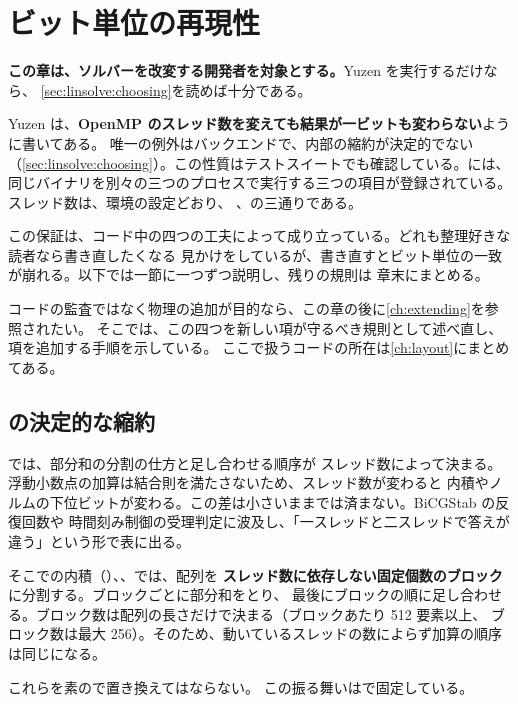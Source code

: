 \chapter{ビット単位の再現性}
\label{ch:reproducibility}

\textbf{この章は、ソルバーを改変する開発者を対象とする。}Yuzen を実行するだけなら、
\cref{sec:linsolve:choosing}を読めば十分である。

Yuzen は、\textbf{OpenMP のスレッド数を変えても結果が一ビットも変わらない}ように書いてある。
唯一の例外はバックエンドで、内部の縮約が決定的でない
（\cref{sec:linsolve:choosing}）。この性質はテストスイートでも確認している。には、
同じバイナリを別々の三つのプロセスで実行する三つの項目が登録されている。スレッド数は、環境の設定どおり、
、の三通りである。

この保証は、コード中の四つの工夫によって成り立っている。どれも整理好きな読者なら書き直したくなる
見かけをしているが、書き直すとビット単位の一致が崩れる。以下では一節に一つずつ説明し、残りの規則は
章末にまとめる。

コードの監査ではなく物理の追加が目的なら、この章の後に\cref{ch:extending}を参照されたい。
そこでは、この四つを新しい項が守るべき規則として述べ直し、項を追加する手順を示している。
ここで扱うコードの所在は\cref{ch:layout}にまとめてある。

\section{の決定的な縮約}
\label{sec:repro:reduction}

では、部分和の分割の仕方と足し合わせる順序が
スレッド数によって決まる。浮動小数点の加算は結合則を満たさないため、スレッド数が変わると
内積やノルムの下位ビットが変わる。この差は小さいままでは済まない。BiCGStab の反復回数や
時間刻み制御の受理判定に波及し、「一スレッドと二スレッドで答えが違う」という形で表に出る。

そこでの内積（）、、では、配列を
\textbf{スレッド数に依存しない固定個数のブロック}に分割する。ブロックごとに部分和をとり、
最後にブロックの順に足し合わせる。ブロック数は配列の長さだけで決まる（ブロックあたり 512 要素以上、
ブロック数は最大 256）。そのため、動いているスレッドの数によらず加算の順序は同じになる。

\begin{warn}[総和の順序を変えてはならない]
  これらを素ので置き換えてはならない。
  この振る舞いはで固定している。
\end{warn}

